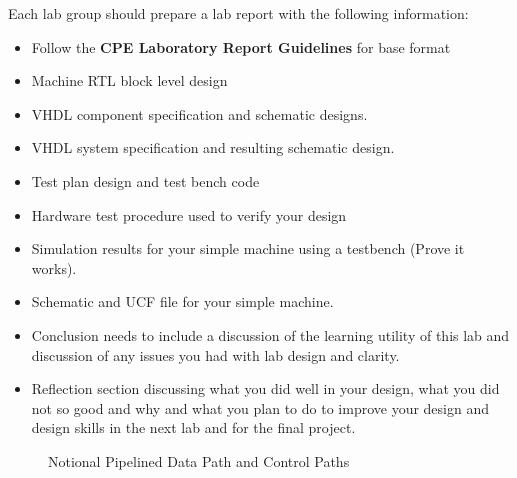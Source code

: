 \documentclass{article}
\begin{document}
Each lab group should prepare a lab report with the following information:
\begin{itemize}
  \item Follow the \textbf{CPE Laboratory Report Guidelines} for base format
  \item Machine RTL block level design
  \item VHDL component specification and schematic designs.
  \item VHDL system specification and resulting schematic design.
  \item Test plan design and test bench code
  \item Hardware test procedure used to verify your design
  \item Simulation results for your simple machine using a testbench (Prove it works).
  \item Schematic and UCF file for your simple machine.
  \item Conclusion needs to include a discussion of the learning utility of this lab and discussion of any issues you had with lab design and clarity.
  \item Reflection section discussing what you did well in your design, what you did not so good and why and what you plan to do to improve your design and design skills in the next lab and for the final project.
\end{itemize}

\begin{figure}[!htbp]
  \centering
  \caption{Notional Pipelined Data Path and Control Paths}
  \label{fig:data_control_paths}
\end{figure}
\end{document}

